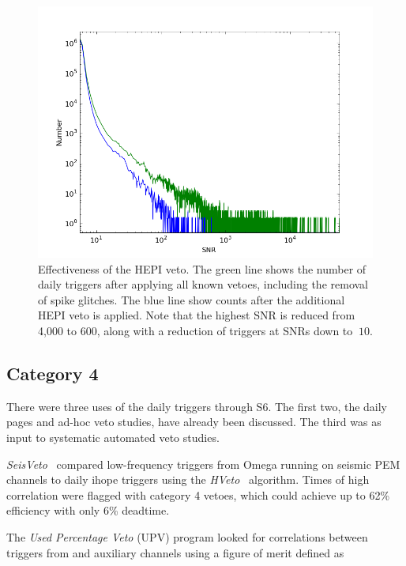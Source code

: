 \begin{figure}
  \includegraphics[width=\linewidth]{figures/detchar/L1-S6B2-snrhist_Cat1234_Spike_HEPI}
  \caption[Effectiveness of the HEPI veto] {
  \label{f:hepi_veto_effectiveness}
Effectiveness of the HEPI veto. The green line shows the number of
daily triggers after applying all known vetoes, including the removal
of spike glitches.  The blue line show counts after the additional
HEPI veto is applied.  Note that the highest SNR is reduced from 
4,000 to 600, along with a reduction of triggers at SNRs down to 
$~ 10$.}
\end{figure}


\subsection{Category 4}



There were three uses of the daily triggers through S6.  The first
two, the daily pages and ad-hoc veto studies, have already been
discussed.  The third was as input to systematic automated veto
studies.

\emph{SeisVeto}~\cite{} compared low-frequency triggers from Omega
running on seismic PEM channels to daily ihope triggers using the
\emph{HVeto}~\cite{} algorithm.  Times of high correlation were
flagged with category 4 vetoes, which could achieve up to 62\%
efficiency with only 6\% deadtime.

The \emph{Used Percentage Veto} (UPV) program looked for correlations
between triggers from \darmerr and auxiliary channels using a figure
of merit defined as

